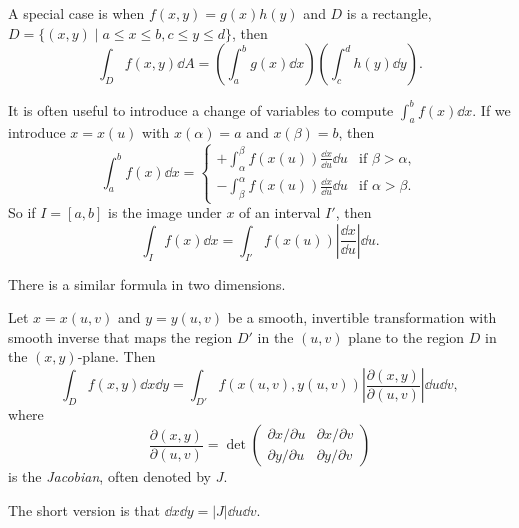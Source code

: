 \documentclass[a4paper]{scrartcl}
\begin{document}
A special case is when $f(x, y) = g(x)h(y)$ and $D$ is a rectangle, $D = \{(x, y) \mid a \leq x \leq b, c \leq y \leq d \}$, then
$$
\int_D f(x, y) \dd A = \left(\int_{a}^b g(x) \dd x\right)\left(\int_c^d h(y) \dd y\right).
$$

It is often useful to introduce a change of variables to compute $\int_a^b f(x) \dd x$.
If we introduce $x = x(u)$ with $x(\alpha) = a$ and $x(\beta) = b$, then
$$
\int_a^b f(x)\dd x = \begin{cases}
	+ \int_\alpha^\beta f(x(u)) \frac{\dd x}{\dd u} \dd u &\mbox{if } \beta > \alpha, \\
	- \int_\beta^\alpha f(x(u)) \frac{\dd x}{\dd u} \dd u  &\mbox{if } \alpha > \beta.
   \end{cases}
$$
So if $I = [a, b]$ is the image under $x$ of an interval $I'$, then
$$
\int_I f(x) \dd x = \int_{I'} f(x(u)) \left|\frac{\dd x}{\dd u}\right| \dd u.
$$

There is a similar formula in two dimensions.

\begin{proposition}
	Let $x = x(u, v)$ and $y = y(u, v)$ be a smooth, invertible transformation with smooth inverse that maps the region $D'$ in the $(u, v)$ plane to the region $D$ in the $(x, y)$-plane.
	Then
	$$
	\int_D f(x, y) \dd x \dd y = \int_{D'} f(x(u, v), y(u, v)) \left|\frac{\partial(x, y)}{\partial(u, v)}\right| \dd u \dd v,
	$$
	where
	$$
	\frac{\partial (x, y)}{\partial (u, v)} = \det\begin{pmatrix}
		\partial x/\partial u & \partial x / \partial v \\
		\partial y / \partial u & \partial y / \partial v
	\end{pmatrix}
	$$
	is the \emph{Jacobian}, often denoted by $J$.
\end{proposition}

The short version is that $\dd x \dd y = |J| \dd u \dd v$.
\end{document}
